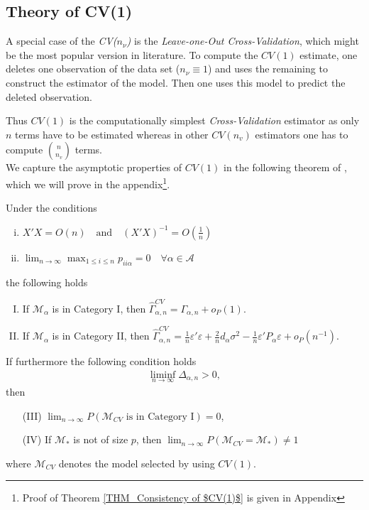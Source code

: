 \documentclass[Research_Module_ES.tex]{subfiles}
\begin{document}
\subsection{Theory of CV(1)}
A special case of the \textit{CV($n_\nu$)} is the \textit{Leave-one-Out Cross-Validation}, which might be the most popular version in literature.
To compute the $CV(1)$ estimate, one deletes one observation of the data set ($n_\nu\equiv1$) and uses the remaining to construct the estimator of the model. Then one uses this model to predict the
deleted observation.

Thus $CV(1)$ is the computationally simplest \textit{Cross-Validation} estimator as only $n$ terms have to be estimated whereas in other $CV(n_v)$ estimators one has to compute $\binom{n}{n_v}$ terms.\\

We capture the asymptotic properties of $CV(1)$ in the following theorem of \cite{shao}, which we will prove in the appendix\footnote{Proof of Theorem \ref{THM_Consistency of $CV(1)$} is given in Appendix }.

\begin{thm}[Consistency of $CV(1)$]
Under the conditions 
\label{THM_Consistency of $CV(1)$}
\begin{enumerate}[(i)]
\item $X'X = O(n) \quad \textrm{and} \quad (X'X)^{-1}=O(\frac{1}{n})$
\item $ \lim_{n \to \infty} \max_{1\le i\le n} p_{ii\alpha} =0 \quad \forall \alpha \in \mathcal{A} $ 
\end{enumerate}
the following holds
\begin{enumerate}[(I)]
\item If $\mathcal{M}_\alpha$ is in Category I, then $\hat{\Gamma}_{\alpha,n}^{CV} = \Gamma_{\alpha,n} + o_P(1)$.
\item If $\mathcal{M}_\alpha$ is in Category II, then $\hat{\Gamma}_{\alpha,n}^{CV} = \frac{1}{n}\varepsilon'\varepsilon + \frac{2}{n}d_\alpha\sigma^2 - \frac{1}{n}\varepsilon'P_\alpha\varepsilon + o_P(n^{-1})$.
\end{enumerate}
If furthermore the following condition holds
\begin{align*}
\liminf_{n\to \infty} \Delta_{\alpha,n} > 0,
\end{align*}
then 
\begin{enumerate}
\item[(III)] $\lim_{n\to\infty} P(\mathcal{M}_{CV}\textrm{ is in Category I})=0$,
\item[(IV)]If $\mathcal{M}_\ast$ is not of size $p$, then $\lim_{n\to\infty}P(\mathcal{M}_{CV}=\mathcal{M}_\ast) \neq 1$
\end{enumerate}
where $\mathcal{M}_{CV}$ denotes the model selected by using $CV(1)$.
\end{thm}
\end{document}
